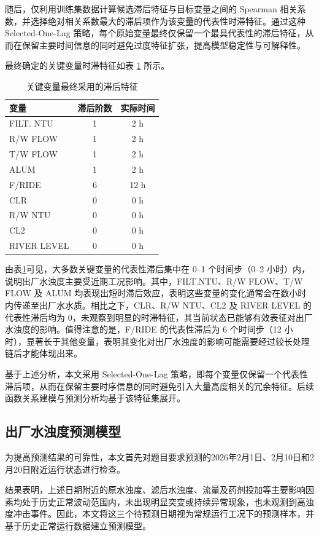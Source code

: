 \documentclass[UTF8,zihao=-4]{ctexart}
\begin{document}
随后，仅利用训练集数据计算候选滞后特征与目标变量之间的 Spearman 相关系数，并选择绝对相关系数最大的滞后项作为该变量的代表性时滞特征。通过这种 Selected-One-Lag 策略，每个原始变量最终仅保留一个最具代表性的滞后特征，从而在保留主要时间信息的同时避免过度特征扩张，提高模型稳定性与可解释性。


最终确定的关键变量时滞特征如表 \ref{tab:lag_feature} 所示。

\begin{table}[H]
\centering
\caption{关键变量最终采用的滞后特征}
\label{tab:lag_feature}
\begin{tabular}{lcc}
\toprule
变量 & 滞后阶数 & 实际时间 \\
\midrule
FILT. NTU & 1 & 2 h \\
R/W FLOW & 1 & 2 h \\
T/W FLOW & 1 & 2 h \\
ALUM & 1 & 2 h \\
F/RIDE & 6 & 12 h \\
CLR & 0 & 0 h \\
R/W NTU & 0 & 0 h \\
CL2 & 0 & 0 h \\
RIVER LEVEL & 0 & 0 h \\
\bottomrule
\end{tabular}
\end{table}


由表\ref{tab:lag_feature}可见，大多数关键变量的代表性滞后集中在 0--1 个时间步（0--2 小时）内，说明出厂水浊度主要受近期工况影响。其中，FILT.NTU、R/W FLOW、T/W FLOW 及 ALUM 均表现出短时滞后效应，表明这些变量的变化通常会在数小时内传递至出厂水水质。相比之下，CLR、R/W NTU、CL2 及 RIVER LEVEL 的代表性滞后均为 0，未观察到明显的时滞特征，其当前状态已能够有效表征对出厂水浊度的影响。值得注意的是，F/RIDE 的代表性滞后为 6 个时间步（12 小时），显著长于其他变量，表明其变化对出厂水浊度的影响可能需要经过较长处理链后才能体现出来。

基于上述分析，本文采用 Selected-One-Lag 策略，即每个变量仅保留一个代表性滞后项，从而在保留主要时序信息的同时避免引入大量高度相关的冗余特征。后续函数关系建模与预测分析均基于该特征集展开。


\subsection{出厂水浊度预测模型}
为提高预测结果的可靠性，本文首先对题目要求预测的2026年2月1日、2月10日和2月20日附近运行状态进行检查。

结果表明，上述日期附近的原水浊度、滤后水浊度、流量及药剂投加等主要影响因素均处于历史正常波动范围内，未出现明显突变或持续异常现象，也未观测到高浊度冲击事件。因此，本文将这三个待预测日期视为常规运行工况下的预测样本，并基于历史正常运行数据建立预测模型。
\end{document}
